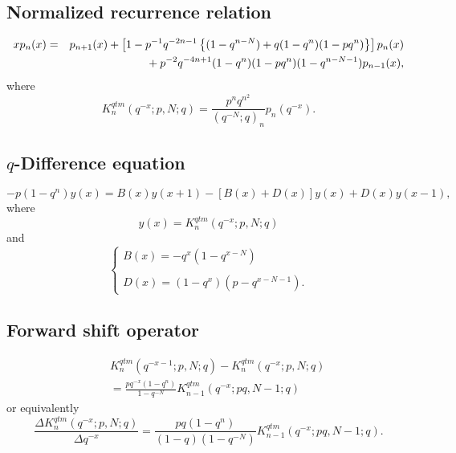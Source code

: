 \documentclass[envcountchap,graybox]{svmono}
\newcommand{\mathindent}{\hspace{7.5mm}}
\begin{document}
\subsection*{Normalized recurrence relation}
\begin{eqnarray}
\label{NormRecQuantumqKrawtchouk}
xp_n(x)&=&p_{n+1}(x)+
\left[1-p^{-1}q^{-2n-1}\left\{(1-q^{n-N})+q(1-q^n)(1-pq^n)\right\}\right]p_n(x)\nonumber\\
& &{}\mathindent{}+p^{-2}q^{-4n+1}(1-q^n)(1-pq^n)(1-q^{n-N-1})p_{n-1}(x),
\end{eqnarray}
where
$$K_n^{qtm}(q^{-x};p,N;q)=\frac{p^nq^{n^2}}{(q^{-N};q)_n}p_n(q^{-x}).$$

\subsection*{$q$-Difference equation}
\begin{equation}
\label{dvQuantumqKrawtchouk}
-p(1-q^n)y(x)=B(x)y(x+1)-\left[B(x)+D(x)\right]y(x)+D(x)y(x-1),
\end{equation}
where
$$y(x)=K_n^{qtm}(q^{-x};p,N;q)$$
and
$$\left\{\begin{array}{l}\displaystyle B(x)=-q^x(1-q^{x-N})\\
\\
\displaystyle D(x)=(1-q^x)(p-q^{x-N-1}).\end{array}\right.$$

\subsection*{Forward shift operator}
\begin{eqnarray}
\label{shift1QuantumqKrawtchoukI}
& &K_n^{qtm}(q^{-x-1};p,N;q)-K_n^{qtm}(q^{-x};p,N;q)\nonumber\\
& &{}=\frac{pq^{-x}(1-q^n)}{1-q^{-N}}K_{n-1}^{qtm}(q^{-x};pq,N-1;q)
\end{eqnarray}
or equivalently
\begin{equation}
\label{shift1QuantumqKrawtchoukII}
\frac{\Delta K_n^{qtm}(q^{-x};p,N;q)}{\Delta q^{-x}}=
\frac{pq(1-q^n)}{(1-q)(1-q^{-N})}K_{n-1}^{qtm}(q^{-x};pq,N-1;q).
\end{equation}
\end{document}
